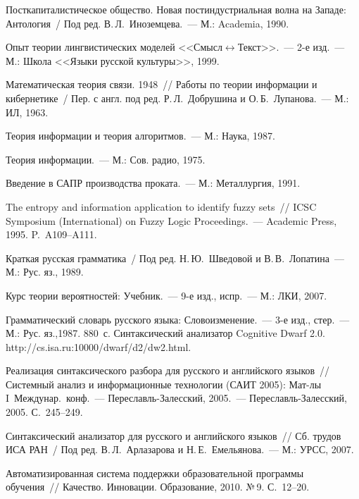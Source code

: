 \begin{multicols}{2}
\vspace*{-6pt}

{\small\frenchspacing
{%
\begin{thebibliography}{99}

Посткапиталистическое общество. Новая постиндустриальная волна на Западе: 
Антология~/ Под ред. В.\,Л.~Иноземцева.~--- М.: Academia, 1990. 

Опыт теории лингвистических моделей <<Смысл\;$\leftrightarrow$\;Текст>>.~--- 
2-е изд.~--- М.: Школа <<Языки русской культуры>>, 1999.

Математическая теория связи. 1948~// Работы по теории информации и 
кибернетике~/ Пер. с англ. под ред. Р.\,Л.~Добрушина и О.\,Б.~Лупанова.~--- 
М.: ИЛ, 1963.

Теория информации и теория алгоритмов.~--- М.: Наука, 1987.

 Теория информации.~--- М.: Сов. радио, 1975.

Введение в САПР производства проката.~--- М.: Металлургия, 1991.

The entropy and information application to identify fuzzy sets~//  ICSC Symposium 
(International) on Fuzzy Logic Proceedings.~---  
Academic Press, 1995. P.~A109--A111.

Краткая русская грамматика~/ Под ред. Н.\,Ю.~Шведовой и 
В.\,В.~Лопатина~--- М.: Рус. яз., 1989.

Курс теории вероятностей: Учебник.~--- 9-е изд., испр.~--- М.: ЛКИ, 2007.

Грамматический словарь русского языка: Словоизменение.~--- 3-е изд., 
стер.~--- М.: Рус. яз.,1987. 880~с.
Синтаксический анализатор Cognitive Dwarf 2.0. {\sf 
http://cs.isa.ru:10000/dwarf/d2/dw2.html}.

Реализация синтаксического разбора для русского и английского языков~// 
Системный анализ и информационные технологии (САИТ 2005): Мат-лы 
I~Междунар.\ конф.~--- Пе\-ре\-славль-За\-лес\-ский, 2005.~--- 
Переславль-Залесский, 2005. С.~245--249.

Синтаксический анализатор для русского и английского языков~// Сб. трудов 
ИСА РАН~/ Под ред. В.\,Л.~Арлазарова и Н.\,Е.~Емельянова.~--- М.: УРСС, 
2007.

\label{end\stat}

Автоматизированная система поддержки образовательной программы 
обучения~// Качество. Инновации. Образование, 2010. №\,9. С.~12--20. 
 \end{thebibliography}
}
}


\end{multicols}       